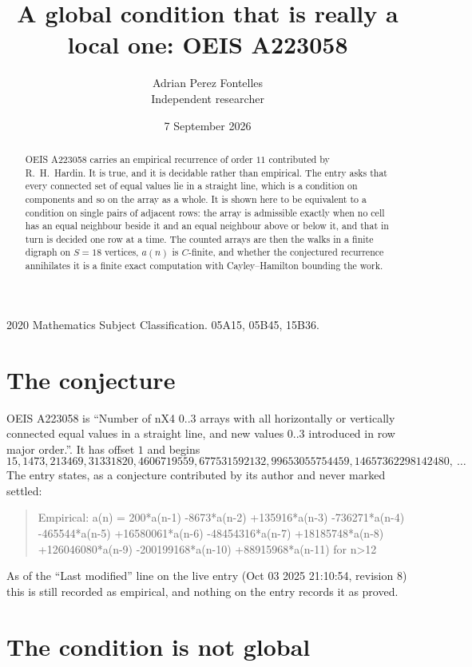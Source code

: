 \documentclass[11pt,a4paper]{article}
\title{A global condition that is really a local one: OEIS A223058}
\author{Adrian Perez Fontelles\\ \small Independent researcher}
\date{7 September 2026}
\theoremstyle{plain}
\theoremstyle{definition}
\begin{document}
\maketitle

\begin{abstract}
OEIS A223058 carries an empirical recurrence of order $11$ contributed by R.~H.~Hardin. It is
true, and it is decidable rather than empirical. The entry asks that every connected set of
equal values lie in a straight line, which is a condition on components and so on the array as
a whole. It is shown here to be equivalent to a condition on single pairs of adjacent rows:
the array is admissible exactly when no cell has an equal neighbour beside it and an equal
neighbour above or below it, and that in turn is decided one row at a time. The counted arrays
are then the walks in a finite digraph on $S=18$ vertices, $a(n)$ is $C$-finite, and whether
the conjectured recurrence annihilates it is a finite exact computation with Cayley--Hamilton
bounding the work.
\end{abstract}

\noindent\small 2020 Mathematics Subject Classification. 05A15, 05B45, 15B36.\normalsize

\section{The conjecture}

OEIS A223058 is ``Number of nX4 0..3 arrays with all horizontally or vertically connected equal values in a straight line, and new values 0..3 introduced in row major order.''. It has offset $1$ and begins
\[
15, 1473, 213469, 31331820, 4606719559, 677531592132, 99653055754459, 14657362298142480,\ \dots
\]
The entry states, as a conjecture contributed by its author and never marked settled:
\begin{quote}
Empirical: a(n) = 200*a(n-1) -8673*a(n-2) +135916*a(n-3) -736271*a(n-4) -465544*a(n-5) +16580061*a(n-6) -48454316*a(n-7) +18185748*a(n-8) +126046080*a(n-9) -200199168*a(n-10) +88915968*a(n-11) for n>12
\end{quote}
As of the ``Last modified'' line on the live entry (Oct 03 2025 21:10:54, revision 8) this is still
recorded as empirical, and nothing on the entry records it as proved.

\section{The condition is not global}
\end{document}
